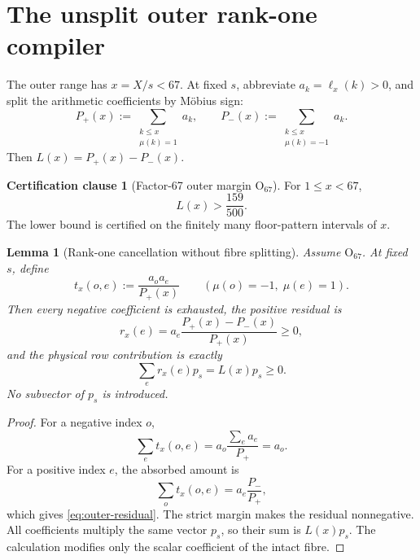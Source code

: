 \documentclass[11pt]{article}
\newtheorem{lemma}[theorem]{Lemma}
\theoremstyle{definition}
\newtheorem{assumption}[theorem]{Certification clause}
\theoremstyle{remark}
\newcommand{\1}{\mathbf 1}
\begin{document}
\section{The unsplit outer rank-one compiler}\label{sec:outer}

The outer range has \(x=X/s<67\).  At fixed \(s\), abbreviate \(a_k=\ell_x(k)>0\), and split the arithmetic coefficients by M\"obius sign:
\begin{equation}\label{eq:Ppm}
P_+(x):=\sum_{\substack{k\le x\\\mu(k)=1}}a_k,
\qquad
P_-(x):=\sum_{\substack{k\le x\\\mu(k)=-1}}a_k.
\end{equation}
Then \(L(x)=P_+(x)-P_-(x)\).

\begin{assumption}[Factor-67 outer margin \(\mathrm O_{67}\)]\label{ass:O67}
For \(1\le x<67\),
\begin{equation}\label{eq:outer-margin}
L(x)>\frac{159}{500}.
\end{equation}
The lower bound is certified on the finitely many floor-pattern intervals of \(x\).
\end{assumption}

\begin{lemma}[Rank-one cancellation without fibre splitting]\label{lem:rank-one}
Assume \(\mathrm O_{67}\).  At fixed \(s\), define
\begin{equation}\label{eq:rank-one}
t_x(o,e):=\frac{a_o a_e}{P_+(x)}
\qquad(\mu(o)=-1,\;\mu(e)=1).
\end{equation}
Then every negative coefficient is exhausted, the positive residual is
\begin{equation}\label{eq:outer-residual}
r_x(e)=a_e\frac{P_+(x)-P_-(x)}{P_+(x)}\ge0,
\end{equation}
and the physical row contribution is exactly
\begin{equation}\label{eq:outer-row}
\sum_e r_x(e)p_s=L(x)p_s\ge0.
\end{equation}
No subvector of \(p_s\) is introduced.
\end{lemma}

\begin{proof}
For a negative index \(o\),
\[
\sum_e t_x(o,e)=a_o\frac{\sum_e a_e}{P_+}=a_o.
\]
For a positive index \(e\), the absorbed amount is
\[
\sum_o t_x(o,e)=a_e\frac{P_-}{P_+},
\]
which gives \eqref{eq:outer-residual}.  The strict margin makes the residual nonnegative.  All coefficients multiply the same vector \(p_s\), so their sum is \(L(x)p_s\).  The calculation modifies only the scalar coefficient of the intact fibre.
\end{proof}
\end{document}

